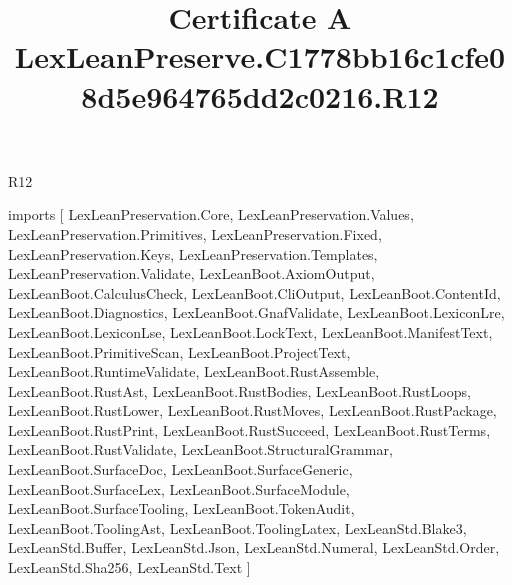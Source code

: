 \begin{lexlean}{R12}
\title{Certificate A LexLeanPreserve.C1778bb16c1cfe08d5e964765dd2c0216.R12}
\begin{coremodule}
imports [
  LexLeanPreservation.Core,
  LexLeanPreservation.Values,
  LexLeanPreservation.Primitives,
  LexLeanPreservation.Fixed,
  LexLeanPreservation.Keys,
  LexLeanPreservation.Templates,
  LexLeanPreservation.Validate,
  LexLeanBoot.AxiomOutput,
  LexLeanBoot.CalculusCheck,
  LexLeanBoot.CliOutput,
  LexLeanBoot.ContentId,
  LexLeanBoot.Diagnostics,
  LexLeanBoot.GnafValidate,
  LexLeanBoot.LexiconLre,
  LexLeanBoot.LexiconLse,
  LexLeanBoot.LockText,
  LexLeanBoot.ManifestText,
  LexLeanBoot.PrimitiveScan,
  LexLeanBoot.ProjectText,
  LexLeanBoot.RuntimeValidate,
  LexLeanBoot.RustAssemble,
  LexLeanBoot.RustAst,
  LexLeanBoot.RustBodies,
  LexLeanBoot.RustLoops,
  LexLeanBoot.RustLower,
  LexLeanBoot.RustMoves,
  LexLeanBoot.RustPackage,
  LexLeanBoot.RustPrint,
  LexLeanBoot.RustSucceed,
  LexLeanBoot.RustTerms,
  LexLeanBoot.RustValidate,
  LexLeanBoot.StructuralGrammar,
  LexLeanBoot.SurfaceDoc,
  LexLeanBoot.SurfaceGeneric,
  LexLeanBoot.SurfaceLex,
  LexLeanBoot.SurfaceModule,
  LexLeanBoot.SurfaceTooling,
  LexLeanBoot.TokenAudit,
  LexLeanBoot.ToolingAst,
  LexLeanBoot.ToolingLatex,
  LexLeanStd.Blake3,
  LexLeanStd.Buffer,
  LexLeanStd.Json,
  LexLeanStd.Numeral,
  LexLeanStd.Order,
  LexLeanStd.Sha256,
  LexLeanStd.Text
]


\end{coremodule}
\end{lexlean}
